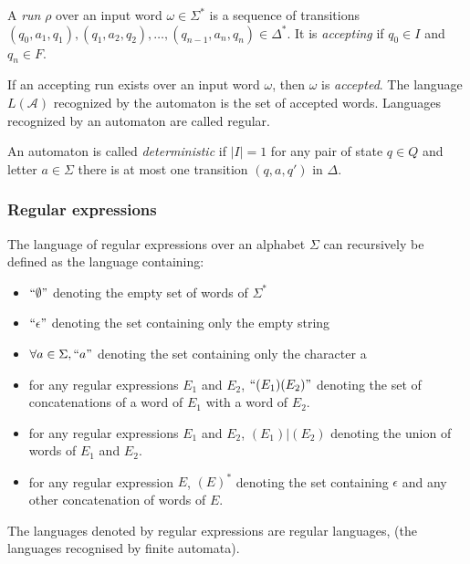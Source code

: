 \documentclass[12px]{article}
\begin{document}
        A \textit{run} $\rho$ over an input word $\omega \in \Sigma^*$ is a
        sequence of transitions $(q_0, a_1, q_1), (q_1, a_2, q_2), \ldots,
        (q_{n-1}, a_n, q_n) \in \Delta^*$. It is \textit{accepting} if $q_0 \in
        I$ and $q_n \in F$.

        If an accepting run exists over an input word $\omega$, then $\omega$
        is \textit{accepted}. The language $L(\mathcal{A})$ recognized by the
        automaton is the set of accepted words. Languages recognized by an
        automaton are called regular.

        An automaton is called \textit{deterministic} if $|I| = 1$ for any
        pair of state $q \in Q$ and letter $a \in \Sigma$ there is at most one
        transition $(q, a, q')$ in $\Delta$.

      \subsubsection{Regular expressions}%
        \label{sec:def:regex}

        The language of regular expressions over an alphabet $\Sigma$ can
        recursively be defined as the language containing:

        \begin{itemize}
          \item $``\emptyset"$ denoting the empty set of words of $\Sigma^*$
          \item $``\epsilon"$ denoting the set containing only the empty string
          \item $\forall a \in \Sigma, ``a"$ denoting the set
            containing only the character a
          \item for any regular expressions $E_1$ and $E_2$, $``(E_1) (E_2)"$
            denoting the set of concatenations of a word of $E_1$ with a word
            of $E_2$.
          \item for any regular expressions $E_1$ and $E_2$, $(E_1)|(E_2)$
            denoting the union of words of $E_1$ and $E_2$.
          \item for any regular expression $E$, $(E)^*$ denoting the set
            containing $\epsilon$ and any other concatenation of words of $E$.
        \end{itemize}


        The languages denoted by regular expressions are regular languages,
        (the languages recognised by finite automata).
\end{document}
